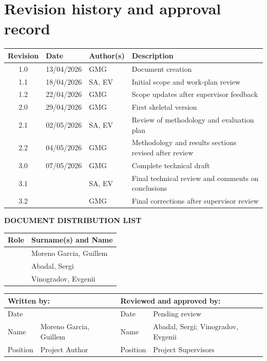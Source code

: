 \vspace*{0cm}

\chapter*{Revision history and approval record}
{}
  
\begin{tabularx}{\textwidth}{|c|l|l|X|}
  \hline
  \textbf{Revision} & \textbf{Date} & \textbf{Author(s)} & \textbf{Description} \\
  \hline
  1.0 & 13/04/2026 & GMG & Document creation \\
  \hline
  1.1 & 18/04/2026 & SA, EV & Initial scope and work-plan review \\
  \hline
  1.2 & 22/04/2026 & GMG & Scope updates after supervisor feedback \\
  \hline
  2.0 & 29/04/2026 & GMG & First skeletal version \\
  \hline
  2.1 & 02/05/2026 & SA, EV & Review of methodology and evaluation plan \\
  \hline
  2.2 & 04/05/2026 & GMG & Methodology and results sections revised after review \\
  \hline
  3.0 & 07/05/2026 & GMG & Complete technical draft \\
  \hline
  3.1 &  & SA, EV & Final technical review and comments on conclusions \\
  \hline
  3.2 &  & GMG & Final corrections after supervisor review \\
  \hline
\end{tabularx}

\vspace{1cm}

\textbf{DOCUMENT DISTRIBUTION LIST}

\begin{tabularx}{\textwidth}{|l|X|}
  \hline
    \textbf{Role} & \textbf{Surname(s) and Name} \\
  \hline
    [Student] & Moreno Garcia, Guillem\\
  \hline
    [Project Supervisor 1] & Abadal, Sergi\\
  \hline
    [Project Supervisor 2] &  Vinogradov, Evgenii\\
  \hline
\end{tabularx}

\vspace{1cm}

\begin{tabularx}{\textwidth}{|l|X||l|X|}
  \hline
    \multicolumn{2}{|l||}{\textbf{Written by:}}  &  \multicolumn{2}{l|}{\textbf{Reviewed and approved by:}} \\
  \hline
    Date &  & Date &  Pending review \\
  \hline
    Name &  Moreno Garcia, Guillem & Name &  Abadal, Sergi; Vinogradov, Evgenii \\
  \hline
    Position & Project Author & Position & Project Supervisors \\
  \hline
\end{tabularx}
